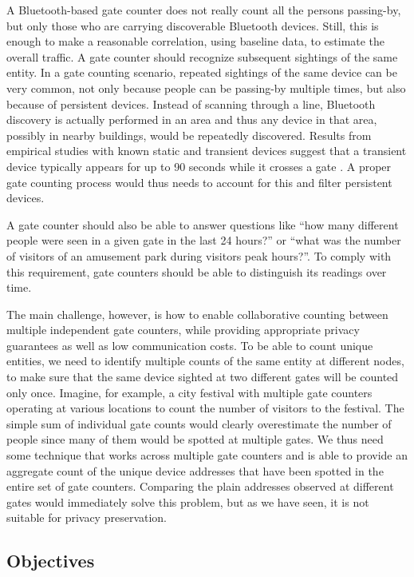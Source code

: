 A Bluetooth-based gate counter does not really count all the persons
passing-by, but only those who are carrying discoverable Bluetooth
devices. Still, this is enough to make a reasonable correlation, using
baseline data, to estimate the overall traffic. A gate counter should
recognize subsequent sightings of the same entity. In a gate counting
scenario, repeated sightings of the same device can be very common,
not only because people can be passing-by multiple times, but also
because of persistent devices. Instead of scanning through a line,
Bluetooth discovery is actually performed in an area and thus any
device in that area, possibly in nearby buildings, would be repeatedly
discovered. Results from empirical studies with known static and
transient devices suggest that a transient device typically appears
for up to 90 seconds while it crosses a gate \cite{Oneill:2006vq}. A
proper gate counting process would thus needs to account for this and
filter persistent devices.

A gate counter should also be able to answer questions like ``how many
different people were seen in a given gate in the last 24 hours?'' or
``what was the number of visitors of an amusement park during visitors
peak hours?''. To comply with this requirement, gate counters should
be able to distinguish its readings over time.

The main challenge, however, is how to enable collaborative counting
between multiple independent gate counters, while providing
appropriate privacy guarantees as well as low communication costs. To
be able to count unique entities, we need to identify multiple counts
of the same entity at different nodes, to make sure that the same
device sighted at two different gates will be counted only once.
Imagine, for example, a city festival with multiple gate counters
operating at various locations to count the number of visitors to the
festival. The simple sum of individual gate counts would clearly
overestimate the number of people since many of them would be spotted
at multiple gates. We thus need some technique that works across
multiple gate counters and is able to provide an aggregate count of
the unique device addresses that have been spotted in the entire set
of gate counters. Comparing the plain addresses observed at different
gates would immediately solve this problem, but as we have seen, it is
not suitable for privacy preservation.

\subsection{Objectives}
\label{sec:objectives}
 
